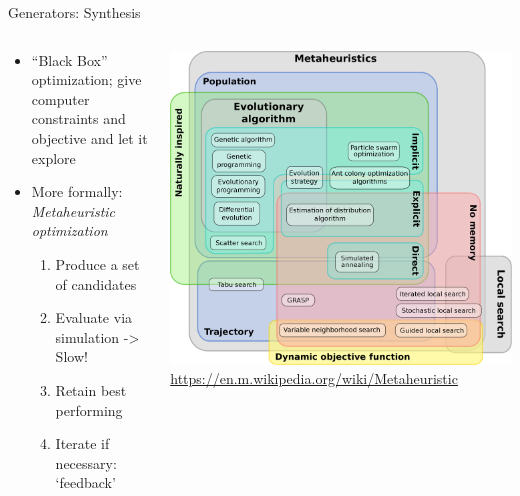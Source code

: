 \begin{frame}{Generators: Synthesis}
\protect\hypertarget{generators-synthesis}{}
\begin{columns}[T]
\begin{column}{0.48\textwidth}
\begin{itemize}
\tightlist
\item
  ``Black Box'' optimization; give computer constraints and objective
  and let it explore
\item
  More formally: \emph{Metaheuristic optimization}

  \begin{enumerate}
  \tightlist
  \item
    Produce a set of candidates
  \item
    Evaluate via simulation -\textgreater{} Slow!
  \item
    Retain best performing
  \item
    Iterate if necessary: `feedback'
  \end{enumerate}
\end{itemize}
\end{column}

\begin{column}{0.48\textwidth}
\includegraphics{../images/IMG_1501.png}
\url{https://en.m.wikipedia.org/wiki/Metaheuristic}
\end{column}
\end{columns}
\end{frame}


